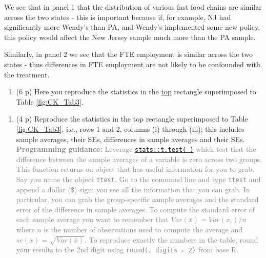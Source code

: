 \documentclass[
]{article}
\providecommand{\tightlist}{%
  \setlength{\itemsep}{0pt}\setlength{\parskip}{0pt}}
\begin{document}
We see that in panel 1 that the distribution of various fast food chains
are similar across the two states - this is important because if, for
example, NJ had significantly more Wendy's than PA, and Wendy's
implemented some new policy, this policy would affect the New Jersey
sample much more than the PA sample.

Similarly, in panel 2 we see that the FTE employment is similar across
the two states - thus differences in FTE employment are not likely to be
confounded with the treatment.

\begin{enumerate}
\def\labelenumi{\arabic{enumi}.}
\setcounter{enumi}{12}
\tightlist
\item
  (6 p) Here you reproduce the statistics in the \underline{top}
  rectangle superimposed to Table
  \ref{fig:CK_Tab3}.\label{item:table3-rows-1-2}
\end{enumerate}

\begin{enumerate}
\def\labelenumi{\alph{enumi}.}
\tightlist
\item
  (4 p) Reproduce the statistics in the top rectangle superimposed to
  Table \ref{fig:CK_Tab3}, i.e., rows 1 and 2, columns (i) through
  (iii); this includes sample averages, their SEs, differences in sample
  averages and their SEs.
  \textcolor{gray}{\textbf{Programming guidance:} Leverage \href{https://www.rdocumentation.org/packages/stats/versions/3.6.2/topics/t.test}{\texttt{stats::t.test( )}} which test that the difference between the sample averages of a variable is zero across two groups. This function returns on object that has useful information for you to grab. Say you name the object \texttt{ttest}. Go to the command line and type \texttt{ttest} and append a dollar (\$) sign: you see all the information that you can grab. In particular, you can grab the group-specific sample averages and the standard error of the difference in sample averages. To compute the standard error of each sample average you want to remember that $Var(\bar{x})=Var(x_i)/n$ where $n$ is the number of observations used to compute the average and $se(\bar{x})=\sqrt{Var(\bar{x})}$. To reproduce exactly the numbers in the table, round your results to the 2nd digit using \texttt{round(, digits = 2)} from base R. }
\end{enumerate}
\end{document}
